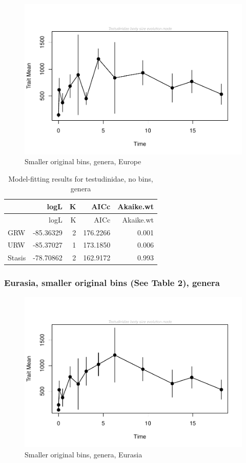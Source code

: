 \documentclass[]{article}
\begin{document}
\begin{figure}[htbp]
\centering
\includegraphics{MA_JJ_files/figure-latex/paleoTS with different time bins, no bins, genera, Europe-1.pdf}
\caption{Smaller original bins, genera, Europe}
\end{figure}

\begin{longtable}[]{@{}lrrrr@{}}
\caption{Model-fitting results for testudinidae, no bins,
genera}\tabularnewline
\toprule
& logL & K & AICc & Akaike.wt\tabularnewline
\midrule
\endfirsthead
\toprule
& logL & K & AICc & Akaike.wt\tabularnewline
\midrule
\endhead
GRW & -85.36329 & 2 & 176.2266 & 0.001\tabularnewline
URW & -85.37027 & 1 & 173.1850 & 0.006\tabularnewline
Stasis & -78.70862 & 2 & 162.9172 & 0.993\tabularnewline
\bottomrule
\end{longtable}

\newpage 

\subsubsection{Eurasia, smaller original bins (See Table 2),
genera}\label{eurasia-smaller-original-bins-see-table-2-genera}

\begin{figure}[htbp]
\centering
\includegraphics{MA_JJ_files/figure-latex/paleoTS with different time bins, no bins, genera, Eurasia-1.pdf}
\caption{Smaller original bins, genera, Eurasia}
\end{figure}
\end{document}
